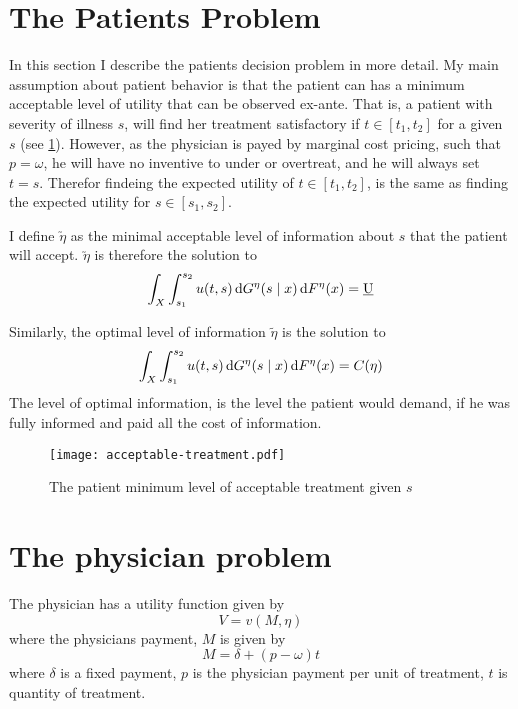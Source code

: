 \section{The Patients Problem} %
\label{sec:the_patients_problem}
In this section I describe the patients decision problem in more detail. My main assumption about patient behavior is that the patient can  has a minimum acceptable level of utility that can be observed ex-ante. That is, a patient with severity of illness \(s\), will find her treatment satisfactory if \(t\in[t_1,t_2]\) for a given \(s\) (see \cref{fig:acceptable-treatment}). However, as the physician is payed by marginal cost pricing, such that \(p=\omega\), he will have no inventive to under or overtreat, and he will always set \(t=s\). Therefor findeing the expected utility of  \(t\in[t_1,t_2]\), is the same as finding the expected utility for  \(s\in[s_1,s_2]\).

I define \(\utilde{\eta}\) as the minimal acceptable level of information about \(s\) that the patient will accept. \(\utilde{\eta}\) is therefore the solution to
\[
	\int_X\int_{s_1}^{s_2}u(t,s)\dif G^{\eta}(s\mid x)\dif F^{\eta}(x)=\underbar{U}
\]

Similarly, the optimal level of information \(\tilde{\eta}\) is the solution to 
\[
	\int_X\int_{s_1}^{s_2}u(t,s)\dif G^{\eta}(s\mid x)\dif F^{\eta}(x)=C(\eta)
\]
The level of optimal information, is the level the patient would demand, if he was fully informed and paid all the cost of information. 
\begin{figure}[htbp]
	\centering
	\texttt{[image: acceptable-treatment.pdf]}
	\caption{The patient minimum level of acceptable treatment given \(s\)}
	\label{fig:acceptable-treatment}
\end{figure}

\section{The physician problem}

The physician has a utility function given by
\[
	V=v(M,\eta)
\]
where the physicians payment, \(M\) is given by
\[
	M=\delta+(p-\omega)t 
\]
where \(\delta\) is a fixed payment, \(p\) is the physician payment per unit of treatment, \(t\) is quantity of treatment.

